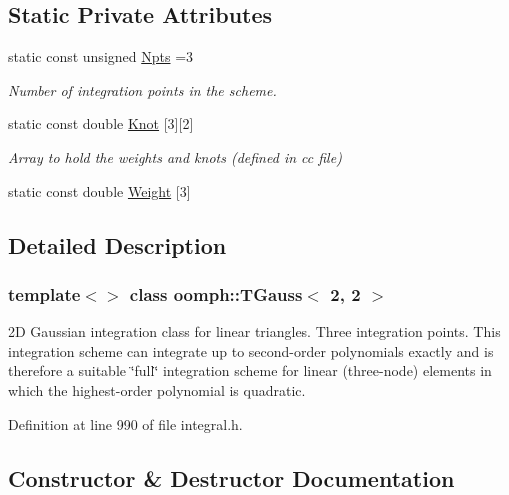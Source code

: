 \subsection*{Static Private Attributes}
\begin{DoxyCompactItemize}
\item 
static const unsigned \hyperlink{classoomph_1_1TGauss_3_012_00_012_01_4_a8b4cada9b62d5e8ee18fbd7e66780368}{Npts} =3
\begin{DoxyCompactList}\small\item\em Number of integration points in the scheme. \end{DoxyCompactList}\item 
static const double \hyperlink{classoomph_1_1TGauss_3_012_00_012_01_4_a4b3ef5fdd2f3d7f9e31c363835ecdbd6}{Knot} \mbox{[}3\mbox{]}\mbox{[}2\mbox{]}
\begin{DoxyCompactList}\small\item\em Array to hold the weights and knots (defined in cc file) \end{DoxyCompactList}\item 
static const double \hyperlink{classoomph_1_1TGauss_3_012_00_012_01_4_a15b24895b6d3e309de659b46d110a21e}{Weight} \mbox{[}3\mbox{]}
\end{DoxyCompactItemize}


\subsection{Detailed Description}
\subsubsection*{template$<$$>$\newline
class oomph\+::\+T\+Gauss$<$ 2, 2 $>$}

2D Gaussian integration class for linear triangles. Three integration points. This integration scheme can integrate up to second-\/order polynomials exactly and is therefore a suitable \char`\"{}full\char`\"{} integration scheme for linear (three-\/node) elements in which the highest-\/order polynomial is quadratic. 

Definition at line 990 of file integral.\+h.



\subsection{Constructor \& Destructor Documentation}
\mbox{\label{classoomph_1_1TGauss_3_012_00_012_01_4_ad9af8d7f419274c7feb66c7cfc231dc4}} 
